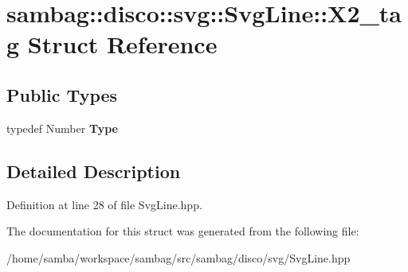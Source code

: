 \hypertarget{structsambag_1_1disco_1_1svg_1_1_svg_line_1_1_x2__tag}{
\section{sambag::disco::svg::SvgLine::X2\_\-tag Struct Reference}
\label{structsambag_1_1disco_1_1svg_1_1_svg_line_1_1_x2__tag}
}
\subsection*{Public Types}
\begin{DoxyCompactItemize}
\item 
\hypertarget{structsambag_1_1disco_1_1svg_1_1_svg_line_1_1_x2__tag_aabb682da3fb1b58a3dd98bc8561f2167}{
typedef Number {\bfseries Type}}
\label{structsambag_1_1disco_1_1svg_1_1_svg_line_1_1_x2__tag_aabb682da3fb1b58a3dd98bc8561f2167}

\end{DoxyCompactItemize}


\subsection{Detailed Description}


Definition at line 28 of file SvgLine.hpp.



The documentation for this struct was generated from the following file:\begin{DoxyCompactItemize}
\item 
/home/samba/workspace/sambag/src/sambag/disco/svg/SvgLine.hpp\end{DoxyCompactItemize}
